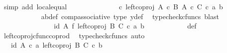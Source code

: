 \begin{isabellebody}
\ {\isacharparenleft}{\kern0pt}simp\ add{\isacharcolon}{\kern0pt}\ local{\isachardot}{\kern0pt}equal{\isacharparenright}{\kern0pt}\isanewline
\ \ \ \ \ \ \ \ \isamarkupfalse%
\ \isamarkupfalse%
\ {\isachardoublequoteopen}{\isachardot}{\kern0pt}{\isachardot}{\kern0pt}{\isachardot}{\kern0pt}\ {\isacharequal}{\kern0pt}\ {\isacharparenleft}{\kern0pt}{\isasymphi}\ {\isasymcirc}\isactrlsub c\ left{\isacharunderscore}{\kern0pt}coproj\ {\isacharparenleft}{\kern0pt}A\ {\isasymtimes}\isactrlsub c\ B{\isacharparenright}{\kern0pt}\ {\isacharparenleft}{\kern0pt}A\ {\isasymtimes}\isactrlsub c\ C{\isacharparenright}{\kern0pt}{\isacharparenright}{\kern0pt}\ {\isasymcirc}\isactrlsub c\ {\isasymlangle}a{\isacharprime}{\kern0pt}{\isacharcomma}{\kern0pt}\ b{\isacharprime}{\kern0pt}{\isasymrangle}{\isachardoublequoteclose}\isanewline
\ \ \ \ \ \ \ \ \ \ \isamarkupfalse%
\ a{\isacharprime}{\kern0pt}b{\isacharprime}{\kern0pt}{\isacharunderscore}{\kern0pt}def\ comp{\isacharunderscore}{\kern0pt}associative{}\ {\isasymphi}{\isacharunderscore}{\kern0pt}type\ y{\isacharprime}{\kern0pt}{\isacharunderscore}{\kern0pt}def\ \isamarkupfalse%
\ {\isacharparenleft}{\kern0pt}typecheck{\isacharunderscore}{\kern0pt}cfuncs{\isacharcomma}{\kern0pt}\ blast{\isacharparenright}{\kern0pt}\isanewline
\ \ \ \ \ \ \ \ \ \ \isamarkupfalse%
\ \isamarkupfalse%
\ {\isachardoublequoteopen}{\isachardot}{\kern0pt}{\isachardot}{\kern0pt}{\isachardot}{\kern0pt}\ {\isacharequal}{\kern0pt}\ {\isacharparenleft}{\kern0pt}id\ A\ {\isasymtimes}\isactrlsub f\ left{\isacharunderscore}{\kern0pt}coproj\ B\ C{\isacharparenright}{\kern0pt}\ {\isasymcirc}\isactrlsub c\ {\isasymlangle}a{\isacharprime}{\kern0pt}{\isacharcomma}{\kern0pt}\ b{\isacharprime}{\kern0pt}{\isasymrangle}{\isachardoublequoteclose}\isanewline
\ \ \ \ \ \ \ \ \ \ \isamarkupfalse%
\ {\isasymphi}{\isacharunderscore}{\kern0pt}def\ \isamarkupfalse%
\ left{\isacharunderscore}{\kern0pt}coproj{\isacharunderscore}{\kern0pt}cfunc{\isacharunderscore}{\kern0pt}coprod\ \isamarkupfalse%
\ {\isacharparenleft}{\kern0pt}typecheck{\isacharunderscore}{\kern0pt}cfuncs{\isacharcomma}{\kern0pt}\ auto{\isacharparenright}{\kern0pt}\isanewline
\ \ \ \ \ \ \ \ \isamarkupfalse%
\ \isamarkupfalse%
\ {\isachardoublequoteopen}{\isachardot}{\kern0pt}{\isachardot}{\kern0pt}{\isachardot}{\kern0pt}\ {\isacharequal}{\kern0pt}\ {\isasymlangle}id\ A\ {\isasymcirc}\isactrlsub c\ a{\isacharprime}{\kern0pt}{\isacharcomma}{\kern0pt}\ left{\isacharunderscore}{\kern0pt}coproj\ B\ C\ {\isasymcirc}\isactrlsub c\ b{\isacharprime}{\kern0pt}{\isasymrangle}{\isachardoublequoteclose}\isanewline

\end{isabellebody}
